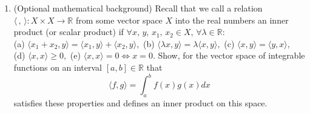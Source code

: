 \documentclass[10pt,a4paper]{article}
\begin{document}
\begin{enumerate}
\item (Optional mathematical background) Recall that we call a relation $\langle \, , \, \rangle:X \times X \rightarrow \mathbb{R}$ from some vector space $X$ into the real numbers an inner product (or scalar product) if $\forall x, \, y, \, x_1, \, x_2 \in X, \, \forall \lambda \in \mathbb{R}:$\\ (a) $\langle x_1 + x_2, y \rangle = \langle x_1,y \rangle + \langle x_2,y \rangle,$ (b) $ \langle \lambda x, y \rangle = \lambda \langle x,y \rangle,$ (c) $\langle x,y \rangle
 = \langle y, x \rangle,$ (d) $\langle x,x \rangle \geq 0,$ (e) $\langle x,x \rangle = 0  \Leftrightarrow x = 0.$ Show, for the vector space of integrable functions on an interval $[a,b] \in \mathbb{R}$ that 
\[ \langle f,g \rangle = \int_a^b f(x) g(x) dx \]
satisfies these properties and defines an inner product on this space.
 \end{enumerate}
\end{document}
